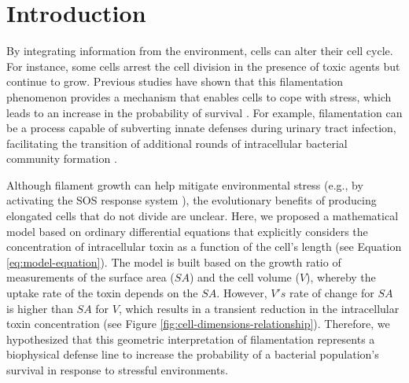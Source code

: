 \documentclass[a4paper, nobind]{templates/ociamthesis}
\begin{document}
\hypertarget{introduction-2}{%
\section{Introduction}\label{introduction-2}}

By integrating information from the environment, cells can alter their cell cycle. For instance, some cells arrest the cell division in the presence of toxic agents but continue to grow. Previous studies have shown that this filamentation phenomenon provides a mechanism that enables cells to cope with stress, which leads to an increase in the probability of survival \autocite{justiceMorphologicalPlasticityBacterial2008}. For example, filamentation can be a process capable of subverting innate defenses during urinary tract infection, facilitating the transition of additional rounds of intracellular bacterial community formation \autocite{justiceFilamentationEscherichiaColi2006}.

Although filament growth can help mitigate environmental stress (e.g., by activating the SOS response system \autocite{justiceMorphologicalPlasticityBacterial2008}), the evolutionary benefits of producing elongated cells that do not divide are unclear. Here, we proposed a mathematical model based on ordinary differential equations that explicitly considers the concentration of intracellular toxin as a function of the cell's length (see Equation \eqref{eq:model-equation}). The model is built based on the growth ratio of measurements of the surface area (\(SA\)) and the cell volume (\(V\)), whereby the uptake rate of the toxin depends on the \(SA\). However, \(V's\) rate of change for \(SA\) is higher than \(SA\) for \(V\), which results in a transient reduction in the intracellular toxin concentration (see Figure \ref{fig:cell-dimensions-relationship}). Therefore, we hypothesized that this geometric interpretation of filamentation represents a biophysical defense line to increase the probability of a bacterial population's survival in response to stressful environments.
\end{document}
